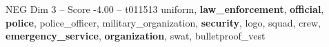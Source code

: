 \begin{textsample}{NEG Dim 3 – Score -4.00 – t011513}  \label{ex:f3_neg_039}
uniform, \textbf{law\_enforcement}, \textbf{official}, \textbf{police}, police\_officer, military\_organization, \textbf{security}, logo, squad, crew, \textbf{emergency\_service}, \textbf{organization}, swat, bulletproof\_vest

\end{textsample}
